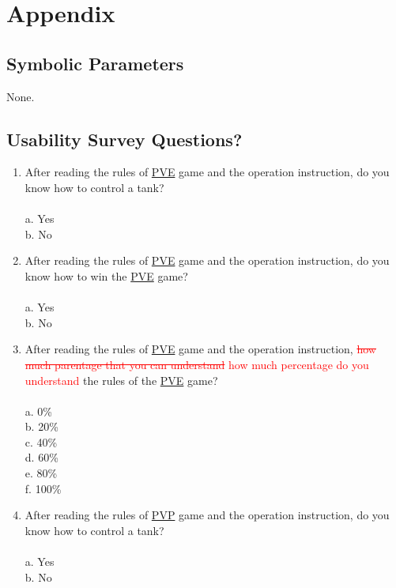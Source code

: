\documentclass[12pt, titlepage]{article}
\begin{document}


\newpage

\section{Appendix}

\subsection{Symbolic Parameters}

None.

\subsection{Usability Survey Questions?}

\begin{enumerate}
\item After reading the rules of \underline{PVE} game and the operation instruction, do you know how to control a tank?\\\\
a. Yes\\
b. No

\item After reading the rules of \underline{PVE} game and the operation instruction, do you know how to win the \underline{PVE} game?\\\\
a. Yes\\
b. No

\item After reading the rules of \underline{PVE} game and the operation instruction, \textcolor{red}{\sout{how much parentage that you can understand} how much percentage do you understand} the rules of the \underline{PVE} game?\\\\
a. 0\%\\
b. 20\%\\
c. 40\%\\
d. 60\%\\
e. 80\%\\
f. 100\%\\

\item After reading the rules of \underline{PVP} game and the operation instruction, do you know how to control a tank?\\\\
a. Yes\\
b. No


\end{enumerate}
\end{document}
